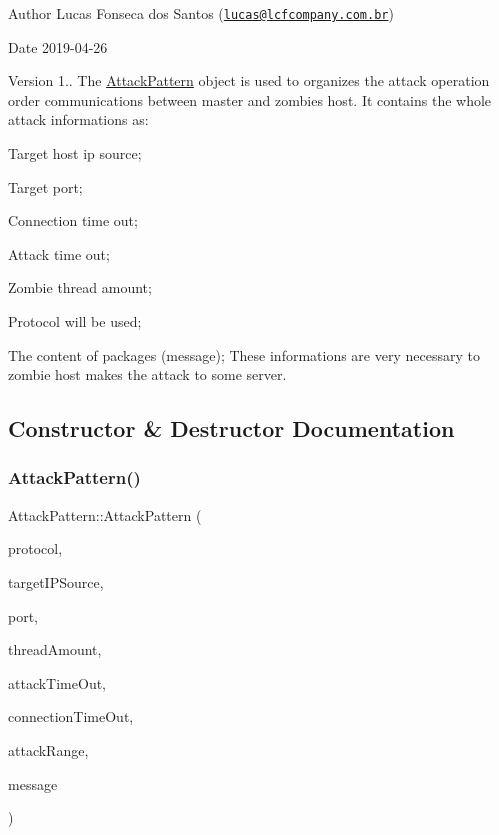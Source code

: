 \begin{DoxyAuthor}{Author}
Lucas Fonseca dos Santos (\href{mailto:lucas@lcfcompany.com.br}{\tt lucas@lcfcompany.\+com.\+br}) 
\end{DoxyAuthor}
\begin{DoxyDate}{Date}
2019-\/04-\/26 
\end{DoxyDate}
\begin{DoxyVersion}{Version}
1.. The \mbox{\hyperlink{classAttackPattern}{Attack\+Pattern}} object is used to organizes the attack operation order communications between master and zombies host. It contains the whole attack informations as\+:
\begin{DoxyItemize}
\item Target host ip source;
\item Target port;
\item Connection time out;
\item Attack time out;
\item Zombie thread amount;
\item Protocol will be used;
\item The content of packages (message); These informations are very necessary to zombie host makes the attack to some server. 
\end{DoxyItemize}
\end{DoxyVersion}


\subsection{Constructor \& Destructor Documentation}
\mbox{\label{classAttackPattern_ac0f07567ed38ca2df936fa7959ad5d82}} 
\subsubsection{\texorpdfstring{Attack\+Pattern()}{AttackPattern()}}
{\footnotesize\ttfamily Attack\+Pattern\+::\+Attack\+Pattern (\begin{DoxyParamCaption}\item[{Protocol\+Type\+::type}]{protocol,  }\item[{std\+::string}]{target\+I\+P\+Source,  }\item[{unsigned short}]{port,  }\item[{unsigned short}]{thread\+Amount,  }\item[{unsigned short}]{attack\+Time\+Out,  }\item[{unsigned short}]{connection\+Time\+Out,  }\item[{unsigned short}]{attack\+Range,  }\item[{std\+::string}]{message }\end{DoxyParamCaption})}

